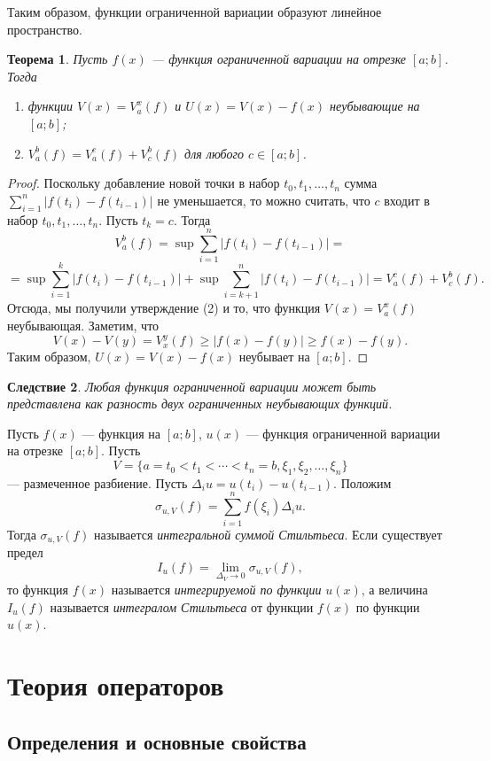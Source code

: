 \documentclass[12pt, titlepage, oneside]{amsbook}
\newtheorem{theorem}{Теорема}[chapter]
\newtheorem{corollary}[theorem]{Следствие}
\theoremstyle{definition}
\theoremstyle{remark}
\begin{document}
Таким образом, функции ограниченной вариации образуют линейное пространство.

\begin{theorem}
	\label{Var3}
	Пусть $f(x)$ --- функция ограниченной вариации на отрезке $[a;b]$. Тогда
	\begin{enumerate}
		\item функции $V(x)=V_a^x(f)$ и $U(x)=V(x)-f(x)$ неубывающие на $[a;b]$;
		\item $V_a^b(f)=V_a^c(f)+V_c^b(f)$ для любого $c\in[a;b]$.
	\end{enumerate}
\end{theorem}

\begin{proof}
	Поскольку добавление новой точки в набор $t_0,t_1,\ldots, t_n$ сумма $\sum\limits_{i=1}^n|f(t_i)-f(t_{i-1})|$ не уменьшается, то можно считать, что $c$ входит в набор $t_0,t_1,\ldots, t_n$. Пусть $t_k=c$. Тогда $$V_a^b(f)=\sup\sum\limits_{i=1}^n|f(t_i)-f(t_{i-1})|=$$ $$=\sup\sum\limits_{i=1}^k|f(t_i)-f(t_{i-1})|+\sup\sum\limits_{i=k+1}^n|f(t_i)-f(t_{i-1})|=V_a^c(f)+V_c^b(f).$$ Отсюда, мы получили утверждение (2) и то, что функция $V(x)=V_a^x(f)$ неубывающая. Заметим, что $$V(x)-V(y)=V_x^y(f)\geq |f(x)-f(y)|\geq f(x)-f(y).$$ Таким образом, $U(x)=V(x)-f(x)$ неубывает на $[a;b]$.
\end{proof}

\begin{corollary}
	\label{Var4}
	Любая функция ограниченной вариации может быть представлена как разность двух ограниченных неубывающих функций.
\end{corollary}

Пусть $f(x)$ --- функция на $[a;b]$, $u(x)$ --- функция ограниченной вариации на отрезке $[a;b]$. Пусть $$V=\{a=t_0<t_1<\cdots<t_n=b,\xi_1,\xi_2,\ldots,\xi_n\}$$ --- размеченное разбиение. Пусть $\Delta_i u=u(t_i)-u(t_{i-1})$. Положим $$\sigma_{u,V}(f)=\sum\limits_{i=1}^n f(\xi_i)\Delta_i u.$$ Тогда $\sigma_{u,V}(f)$ называется \emph{интегральной суммой Стильтьеса}. Если существует предел $$I_u(f)=\lim\limits_{\Delta_V\rightarrow 0} \sigma_{u,V}(f),$$ то функция $f(x)$ называется \emph{интегрируемой по функции} $u(x)$, а величина $I_u(f)$ называется \emph{интегралом Стильтьеса} от функции $f(x)$ по функции $u(x)$.

\chapter{Теория операторов}

\section{Определения и основные свойства}
\end{document}
